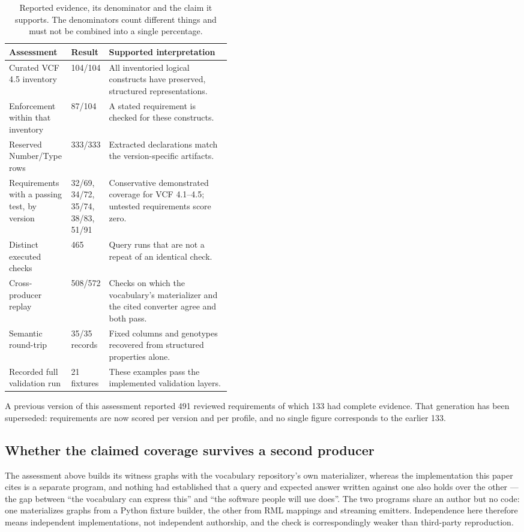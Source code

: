 \documentclass{ceurart}
\begin{document}
\begin{table}[htbp]
\caption{Reported evidence, its denominator and the claim it supports. The denominators count different things and must not be combined into a single percentage.}
\label{tab:evidence}
\centering\small
\begin{tabularx}{\linewidth}{@{}p{0.28\linewidth}p{0.15\linewidth}X@{}}
\toprule
Assessment & Result & Supported interpretation \\
\midrule
Curated VCF 4.5 inventory & 104/104 & All inventoried logical constructs have preserved, structured representations. \\
Enforcement within that inventory & 87/104 & A stated requirement is checked for these constructs. \\
Reserved Number/Type rows & 333/333 & Extracted declarations match the version-specific artifacts. \\
Requirements with a passing test, by version & 32/69, 34/72, 35/74, 38/83, 51/91 & Conservative demonstrated coverage for VCF 4.1--4.5; untested requirements score zero. \\
Distinct executed checks & 465 & Query runs that are not a repeat of an identical check. \\
Cross-producer replay & 508/572 & Checks on which the vocabulary's materializer and the cited converter agree and both pass. \\
Semantic round-trip & 35/35 records & Fixed columns and genotypes recovered from structured properties alone. \\
Recorded full validation run & 21 fixtures & These examples pass the implemented validation layers. \\
\bottomrule
\end{tabularx}
\end{table}

A previous version of this assessment reported 491 reviewed requirements of which 133 had complete evidence. 
That generation has been superseded: requirements are now scored per version and per profile, and no single figure corresponds to the earlier 133.

\subsection{Whether the claimed coverage survives a second producer}
\label{sec:crossproducer}

The assessment above builds its witness graphs with the vocabulary repository's own materializer, whereas the implementation this paper cites is a separate program, and nothing had established that a query and expected answer written against one also holds over the other --- the gap between ``the vocabulary can express this'' and ``the software people will use does''. 
The two programs share an author but no code: one materializes graphs from a Python fixture builder, the other from RML mappings and streaming emitters. 
Independence here therefore means independent implementations, not independent authorship, and the check is correspondingly weaker than third-party reproduction.
\end{document}
